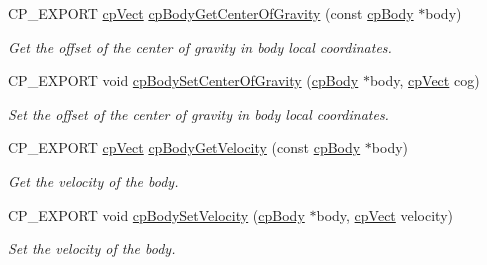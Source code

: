 \begin{DoxyCompactItemize}
\mbox{\label{group__cp_body_ga32c08449fc0c120086b20f821d582a1f}} 
C\+P\+\_\+\+E\+X\+P\+O\+RT \mbox{\hyperlink{structcp_vect}{cp\+Vect}} \mbox{\hyperlink{group__cp_body_ga32c08449fc0c120086b20f821d582a1f}{cp\+Body\+Get\+Center\+Of\+Gravity}} (const \mbox{\hyperlink{structcp_body}{cp\+Body}} $\ast$body)
\begin{DoxyCompactList}\small\item\em Get the offset of the center of gravity in body local coordinates. \end{DoxyCompactList}\item 
\mbox{\label{group__cp_body_ga85057b92d52ce18f6442c82d6fbb4f2c}} 
C\+P\+\_\+\+E\+X\+P\+O\+RT void \mbox{\hyperlink{group__cp_body_ga85057b92d52ce18f6442c82d6fbb4f2c}{cp\+Body\+Set\+Center\+Of\+Gravity}} (\mbox{\hyperlink{structcp_body}{cp\+Body}} $\ast$body, \mbox{\hyperlink{structcp_vect}{cp\+Vect}} cog)
\begin{DoxyCompactList}\small\item\em Set the offset of the center of gravity in body local coordinates. \end{DoxyCompactList}\item 
\mbox{\label{group__cp_body_gad7b8c4ed9d76d9eb139e925d5f1c09e5}} 
C\+P\+\_\+\+E\+X\+P\+O\+RT \mbox{\hyperlink{structcp_vect}{cp\+Vect}} \mbox{\hyperlink{group__cp_body_gad7b8c4ed9d76d9eb139e925d5f1c09e5}{cp\+Body\+Get\+Velocity}} (const \mbox{\hyperlink{structcp_body}{cp\+Body}} $\ast$body)
\begin{DoxyCompactList}\small\item\em Get the velocity of the body. \end{DoxyCompactList}\item 
\mbox{\label{group__cp_body_gacf91e39f46b062dba71d750f806aa60c}} 
C\+P\+\_\+\+E\+X\+P\+O\+RT void \mbox{\hyperlink{group__cp_body_gacf91e39f46b062dba71d750f806aa60c}{cp\+Body\+Set\+Velocity}} (\mbox{\hyperlink{structcp_body}{cp\+Body}} $\ast$body, \mbox{\hyperlink{structcp_vect}{cp\+Vect}} velocity)
\begin{DoxyCompactList}\small\item\em Set the velocity of the body. \end{DoxyCompactList}\item 
\mbox{\label{group__cp_body_ga8be8f23f2dd41bf20a23b41e87232f46}} 

\end{DoxyCompactItemize}
